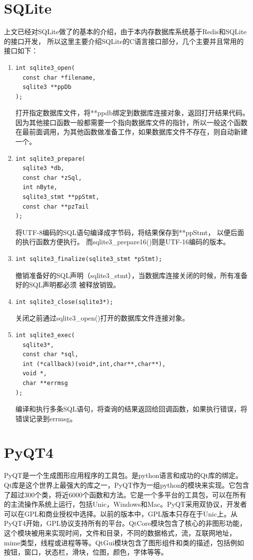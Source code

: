 \documentclass{zjutthesis}
\begin{document}
\section{SQLite}
上文已经对SQLite做了的基本的介绍，由于本内存数据库系统基于Redis和SQLite的接口开发， 所以这里主要介绍SQLite的C语言接口部分，几个主要并且常用的接口如下：
\begin{enumerate}[label=（\arabic*）]
\item{
\begin{verbatim}
int sqlite3_open(
  const char *filename,
  sqlite3 **ppDb
);
\end{verbatim}
打开指定数据库文件，将**ppdb绑定到数据库连接对象，返回打开结果代码。因为其他接口函数一般都需要一个指向数据库文件的指针，所以一般这个函数在最前面调用，为其他函数做准备工作，如果数据库文件不存在，则自动新建一个。
}
\item{
\begin{verbatim}
int sqlite3_prepare(
  sqlite3 *db,
  const char *zSql,
  int nByte,
  sqlite3_stmt **ppStmt,
  const char **pzTail
);
\end{verbatim}
将UTF-8编码的SQL语句编译成字节码，将结果保存到**ppStmt，
以便后面的执行函数方便执行。
而sqlite3\_prepare16()则是UTF-16编码的版本。
}
\item{
\begin{verbatim}
int sqlite3_finalize(sqlite3_stmt *pStmt);
\end{verbatim}
撤销准备好的SQL声明（sqlite3\_stmt），当数据库连接关闭的时候，所有准备好的SQL声明都必须
被释放销毁。
}
\item{
\begin{verbatim}
int sqlite3_close(sqlite3*);
\end{verbatim}
关闭之前通过sqlite3\_open()打开的数据库文件连接对象。
}
\item{
\begin{verbatim}
int sqlite3_exec(
  sqlite3*,
  const char *sql,
  int (*callback)(void*,int,char**,char**),
  void *,
  char **errmsg
);
\end{verbatim}
编译和执行多条SQL语句，将查询的结果返回给回调函数，如果执行错误，将错误记录到errmsg。
}
\end{enumerate}

\section{PyQT4}
PyQT是一个生成图形应用程序的工具包。是python语言和成功的Qt库的绑定。Qt库是这个世界上最强大的库之一，PyQT作为一组python的模块来实现。它包含了超过300个类，将近6000个函数和方法。它是一个多平台的工具包，可以在所有的主流操作系统上运行，包括Unic，Windows和Mac。PyQT采用双协议，开发者可以在GPL和商业授权中选择。以前的版本中，GPL版本只存在于Unic上。从PyQT4开始，GPL协议支持所有的平台。QtCore模块包含了核心的非图形功能，这个模块被用来实现时间，文件和目录，不同的数据格式，流，互联网地址，mime类型，线程或进程等等。QtGui模块包含了图形组件和类的描述，包括例如按钮，窗口，状态栏，滑块，位图，颜色，字体等等。
\end{document}
